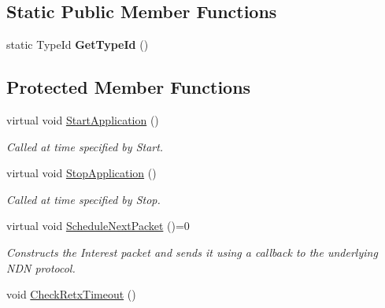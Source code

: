 \subsection*{Static Public Member Functions}
\begin{DoxyCompactItemize}
\item 
static Type\+Id {\bfseries Get\+Type\+Id} ()\hypertarget{classns3_1_1ndn_1_1Consumer_a4139ceba2a1a54b9921c2137e8525836}{}\label{classns3_1_1ndn_1_1Consumer_a4139ceba2a1a54b9921c2137e8525836}

\end{DoxyCompactItemize}
\subsection*{Protected Member Functions}
\begin{DoxyCompactItemize}
\item 
virtual void \hyperlink{classns3_1_1ndn_1_1Consumer_aa04fb7a2f442560aab260e9756672e33}{Start\+Application} ()\hypertarget{classns3_1_1ndn_1_1Consumer_aa04fb7a2f442560aab260e9756672e33}{}\label{classns3_1_1ndn_1_1Consumer_aa04fb7a2f442560aab260e9756672e33}

\begin{DoxyCompactList}\small\item\em Called at time specified by Start. \end{DoxyCompactList}\item 
virtual void \hyperlink{classns3_1_1ndn_1_1Consumer_a6cbdd3e814e7cb00645292e52dc0b1f2}{Stop\+Application} ()\hypertarget{classns3_1_1ndn_1_1Consumer_a6cbdd3e814e7cb00645292e52dc0b1f2}{}\label{classns3_1_1ndn_1_1Consumer_a6cbdd3e814e7cb00645292e52dc0b1f2}

\begin{DoxyCompactList}\small\item\em Called at time specified by Stop. \end{DoxyCompactList}\item 
virtual void \hyperlink{classns3_1_1ndn_1_1Consumer_aafd577489ed42242050b2040692a83fa}{Schedule\+Next\+Packet} ()=0\hypertarget{classns3_1_1ndn_1_1Consumer_aafd577489ed42242050b2040692a83fa}{}\label{classns3_1_1ndn_1_1Consumer_aafd577489ed42242050b2040692a83fa}

\begin{DoxyCompactList}\small\item\em Constructs the Interest packet and sends it using a callback to the underlying N\+DN protocol. \end{DoxyCompactList}\item 
void \hyperlink{classns3_1_1ndn_1_1Consumer_ad7b7433d6f18ebf4e58608eb9ad9d399}{Check\+Retx\+Timeout} ()\hypertarget{classns3_1_1ndn_1_1Consumer_ad7b7433d6f18ebf4e58608eb9ad9d399}{}\label{classns3_1_1ndn_1_1Consumer_ad7b7433d6f18ebf4e58608eb9ad9d399}


\end{DoxyCompactItemize}
